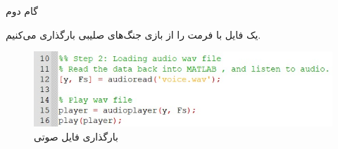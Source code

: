 \Problem
{گام دوم}
{
یک فایل با فرمت 
را از بازی جنگ‌های صلیبی بارگذاری می‌کنیم.

\begin{figure}[H]
    \includegraphics[width=15cm]{Images/input.jpg}
    \centering
    \caption{بارگذاری فایل صوتی}
\end{figure}
}
